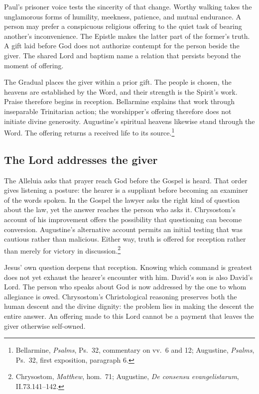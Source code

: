 Paul's prisoner voice tests the sincerity of that change. Worthy walking takes the unglamorous forms of humility, meekness, patience, and mutual endurance. A person may prefer a conspicuous religious offering to the quiet task of bearing another's inconvenience. The Epistle makes the latter part of the former's truth. A gift laid before God does not authorize contempt for the person beside the giver. The shared Lord and baptism name a relation that persists beyond the moment of offering.

The Gradual places the giver within a prior gift. The people is chosen, the heavens are established by the Word, and their strength is the Spirit's work. Praise therefore begins in reception. Bellarmine explains that work through inseparable Trinitarian action; the worshipper's offering therefore does not initiate divine generosity. Augustine's spiritual heavens likewise stand through the Word. The offering returns a received life to its source.\footnote{Bellarmine, \textit{Psalms}, Ps.~32, commentary on vv.~6 and 12; Augustine, \textit{Psalms}, Ps.~32, first exposition, paragraph 6.}

\subsection{The Lord addresses the giver}
The Alleluia asks that prayer reach God before the Gospel is heard. That order gives listening a posture: the hearer is a suppliant before becoming an examiner of the words spoken. In the Gospel the lawyer asks the right kind of question about the law, yet the answer reaches the person who asks it. Chrysostom's account of his improvement offers the possibility that questioning can become conversion. Augustine's alternative account permits an initial testing that was cautious rather than malicious. Either way, truth is offered for reception rather than merely for victory in discussion.\footnote{Chrysostom, \textit{Matthew}, hom.~71; Augustine, \textit{De consensu evangelistarum}, II.73.141--142.}

Jesus' own question deepens that reception. Knowing which command is greatest does not yet exhaust the hearer's encounter with him. David's son is also David's Lord. The person who speaks about God is now addressed by the one to whom allegiance is owed. Chrysostom's Christological reasoning preserves both the human descent and the divine dignity: the problem lies in making the descent the entire answer. An offering made to this Lord cannot be a payment that leaves the giver otherwise self-owned.

